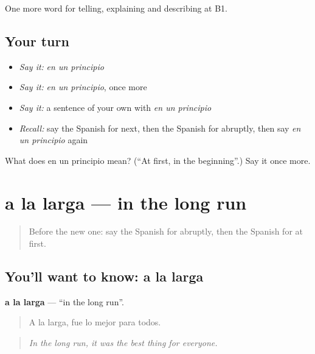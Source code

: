 \begin{grammarlens}[title={What you've built}]
One more word for telling, explaining and describing at B1.
\end{grammarlens}

\subsection*{Your turn}
\begin{itemize}
\raggedright
  \item \emph{Say it:} \emph{en un principio}
  \item \emph{Say it:} \emph{en un principio}, once more
  \item \emph{Say it:} a sentence of your own with \emph{en un principio}
  \item \emph{Recall:} say the Spanish for next, then the Spanish for abruptly, then say \emph{en un principio} again
\end{itemize}

\begin{tcolorbox}[breakable,colback=teal!4,colframe=teal!35!black,title={Before you move on}]
What does en un principio mean? (\textquotedblleft{}At first, in the beginning\textquotedblright{}.) Say it once more.
\end{tcolorbox}
\section[a la larga]{a la larga — in the long run}

\label{lesson:ES-C535-a-la-larga}



\begin{quote}
Before the new one: say the Spanish for abruptly, then the Spanish for at first.
\end{quote}

\subsection*{You'll want to know: a la larga}
\textbf{a la larga} — \textquotedblleft{}in the long run\textquotedblright{}.

\begin{quote}
A la larga, fue lo mejor para todos.
\end{quote}

\begin{quote}
\emph{In the long run, it was the best thing for everyone.}
\end{quote}


